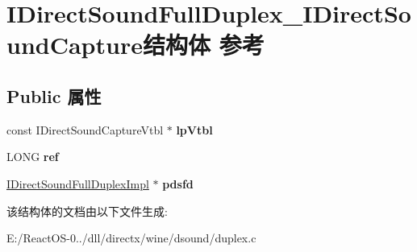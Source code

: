 \hypertarget{struct_i_direct_sound_full_duplex___i_direct_sound_capture}{}\section{I\+Direct\+Sound\+Full\+Duplex\+\_\+\+I\+Direct\+Sound\+Capture结构体 参考}
\label{struct_i_direct_sound_full_duplex___i_direct_sound_capture}
\subsection*{Public 属性}
\begin{DoxyCompactItemize}
\item 
\mbox{\label{struct_i_direct_sound_full_duplex___i_direct_sound_capture_a2b01519c5727dbc8de7014bced203b99}} 
const I\+Direct\+Sound\+Capture\+Vtbl $\ast$ {\bfseries lp\+Vtbl}
\item 
\mbox{\label{struct_i_direct_sound_full_duplex___i_direct_sound_capture_af6509a3f19108767b62172e32118005e}} 
L\+O\+NG {\bfseries ref}
\item 
\mbox{\label{struct_i_direct_sound_full_duplex___i_direct_sound_capture_a784aa40ccca0a01f79c4ab9efe5a66f1}} 
\hyperlink{struct_i_direct_sound_full_duplex_impl}{I\+Direct\+Sound\+Full\+Duplex\+Impl} $\ast$ {\bfseries pdsfd}
\end{DoxyCompactItemize}


该结构体的文档由以下文件生成\+:\begin{DoxyCompactItemize}
\item 
E\+:/\+React\+O\+S-\/0../dll/directx/wine/dsound/duplex.\+c\end{DoxyCompactItemize}
